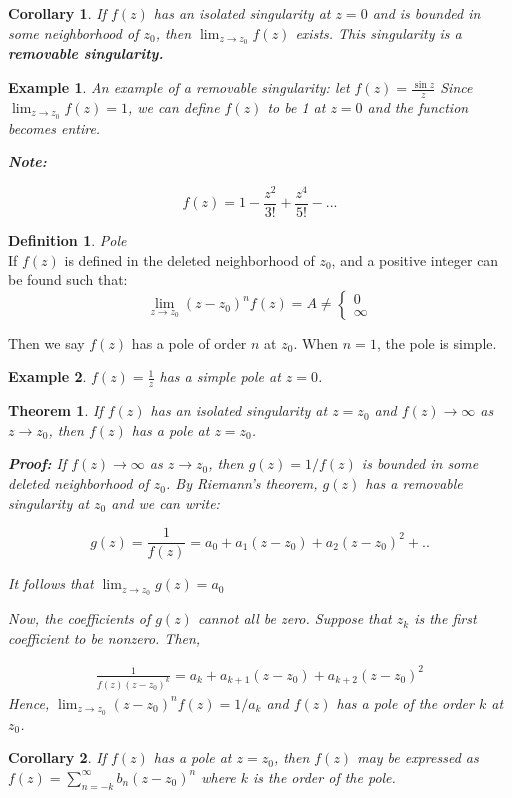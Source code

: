 \documentclass{article}
\newtheorem{theorem}{Theorem}[section]
\newtheorem{corollary}{Corollary}
\newtheorem{ex}{Example}
\theoremstyle{definition}
\newtheorem{definition}{Definition}[section]
\newcommand{\Def}[2]{
\begin{shaded*}
\begin{definition}{\textit{#1}}\\#2\end{definition}
\end{shaded*}
}
\begin{document}
\begin{corollary}
If $f(z)$ has an isolated singularity at $z=0$ and is bounded in some neighborhood of $z_0$, then $\lim_{z \to z_0}f(z)$ exists. This singularity is a \textbf{removable singularity.}
\end{corollary}

\begin{ex}
An example of a removable singularity: let $f(z) = \frac{\sin z}{z}$ Since $\lim_{z \to z_0}f(z) = 1$, we can define $f(z)$ to be 1 at $z=0$ and the function becomes entire. 

\textbf{Note:} 

$$f(z) = 1 - \frac{z^2}{3!} + \frac{z^4}{5!} - ... $$
\end{ex}

\Def{Pole}{If $f(z)$ is defined in the deleted neighborhood of $z_0$, and a positive integer can be found such that:
$$\lim_{z \to z_0} (z-z_0)^n f(z) = A \neq \begin{cases}
0 \\ \infty 
\end{cases}$$

Then we say $f(z)$ has a pole of order $n$ at $z_0$. When $n=1$, the pole is simple.}

\begin{ex}
$f(z) = \frac{1}{z}$ has a simple pole at $z=0$. 
\end{ex}

\begin{theorem}
If $f(z)$ has an isolated singularity at $z = z_0$ and $f(z) \to \infty$ as $z \to z_0$, then $f(z)$ has a pole at $z=z_0$.

\textbf{Proof:}
If $f(z) \to \infty$ as $z \to z_0$, then $g(z) = 1/f(z)$ is bounded in some deleted neighborhood of $z_0$. By Riemann's theorem, $g(z)$ has a removable singularity at $z_0$ and we can write:

$$g(z) = \frac{1}{f(z)} = a_0 + a_1(z-z_0) + a_2(z-z_0)^2 + ..$$

It follows that $\lim_{z \to z_0}g(z) = a_0$

Now, the coefficients of $g(z)$ cannot all be zero. Suppose that $z_k$ is the first coefficient to be nonzero. Then, 

\begin{align}
\frac{1}{f(z)(z-z_0)^k} = a_k + a_{k+1}(z-z_0) + a_{k+2}(z-z_0)^2
\end{align}
Hence, $\lim_{z \to z_0} (z-z_0)^n f(z) = 1/a_k$ and $f(z)$ has a pole of the order $k$ at $z_0$.
\end{theorem}
\begin{corollary}
If $f(z)$ has a pole at $z=z_0$, then $f(z)$ may be expressed as $f(z) = \sum_{n=-k}^{\infty} b_n(z-z_0)^n$ where $k$ is the order of the pole. 
\end{corollary}
\end{document}
